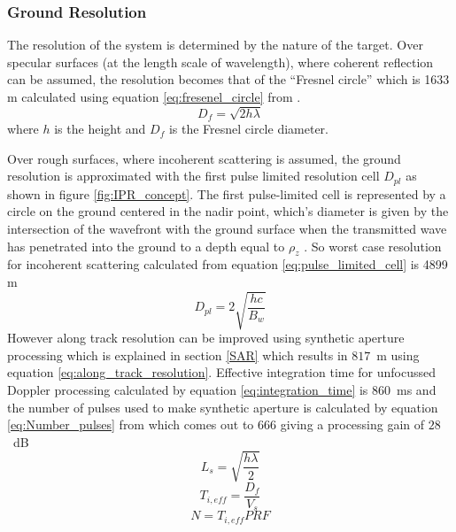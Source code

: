 \subsubsection{Ground Resolution}
%
The resolution of the system is determined by the nature of the target. Over specular surfaces (at the length scale of wavelength), where coherent reflection can be assumed, the resolution becomes that of the ``Fresnel circle'' which is 1633 m calculated using equation \ref{eq:fresenel_circle} from \cite{SHARAD}.
\begin{equation}
D_{f} = \sqrt{2h\lambda}
\label{eq:fresenel_circle}
\end{equation}
where $h$ is the height and $D_{f}$ is the Fresnel circle diameter.

Over rough surfaces, where incoherent scattering is assumed, the ground resolution is approximated with the first pulse limited resolution cell $D_{pl}$ as shown in figure \ref{fig:IPR_concept}. The first pulse-limited cell is represented by a circle on the ground centered in the nadir point, which's diameter is given by the intersection of the wavefront with the ground surface when the transmitted wave has penetrated into the ground to a depth equal to $\rho_{z}$ \cite{Gany_SRS}. So worst case resolution for incoherent scattering calculated from equation \ref{eq:pulse_limited_cell} is 4899 m 
\begin{equation}
D_{pl} = 2\sqrt{\dfrac{hc}{B_{w}}}
\label{eq:pulse_limited_cell}
\end{equation}
However along track resolution can be improved using synthetic aperture processing which is explained in section \ref{SAR} which results in $817$~m using equation \ref{eq:along_track_resolution}. Effective integration time for unfocussed Doppler processing calculated by equation \ref{eq:integration_time} is $860$~ms and the number of pulses used to make synthetic aperture is calculated by equation \ref{eq:Number_pulses} from \cite{Gany_SRS}  which comes out to 666 giving a processing gain of $28$~dB 
%
\begin{equation}
L_{s} = \sqrt{\dfrac{h\lambda}{2}}
\label{eq:along_track_resolution}
\end{equation}
%
\begin{equation}
T_{i,eff} = \dfrac{D_{f}}{V_{s}}
\label{eq:integration_time}
\end{equation}
\begin{equation}
N = T_{i,eff}PRF 
\label{eq:Number_pulses}
\end{equation}
%
